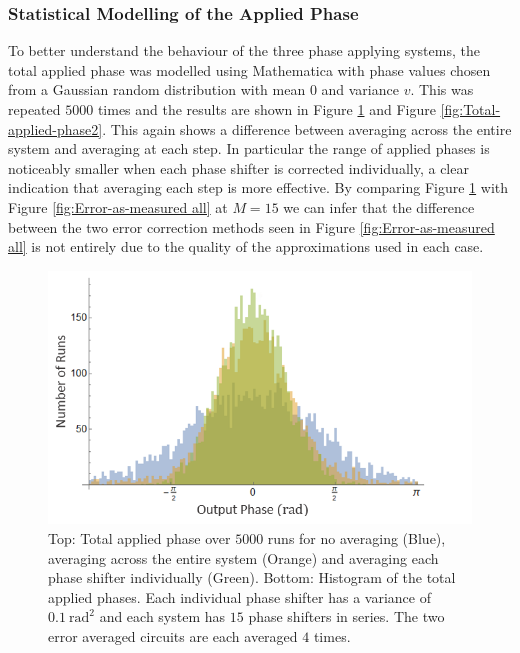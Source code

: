 \documentclass[aps,pra,twocolumn,superscriptaddress,numerical]{revtex4-1}
\begin{document}
		
		\subsubsection{Statistical Modelling of the Applied Phase\label{Statistical Modelling of the Applied Phase}}
		
		To better understand the behaviour of the three phase applying systems, the total applied phase was modelled using Mathematica with phase values chosen from a Gaussian random distribution with mean $0$ and variance $v$. This was repeated $5000$ times and the results are shown in Figure \ref{fig:Total-applied-phase1} and Figure \ref{fig:Total-applied-phase2}. This again shows a difference between averaging across the entire system and averaging at each step. In particular the range of applied phases is noticeably smaller when each phase shifter is corrected individually, a clear indication that averaging each step is more effective. By comparing Figure \ref{fig:Total-applied-phase1} with Figure \ref{fig:Error-as-measured all} at $M=15$ we can infer that the difference between the two error correction methods seen in Figure \ref{fig:Error-as-measured all} is not entirely due to the quality of the approximations used in each case.
		
		\begin{figure}
			\begin{centering}
				\includegraphics[width=\columnwidth]{totPhase1.png}
				\par\end{centering}
			
			\caption[Statistical simulation of total applied phase for no correction, correcting across the system and correcting each element individually for a larger system. ]{Top: Total applied phase over $5000$ runs for no averaging (Blue), averaging across the entire system (Orange) and averaging each phase shifter individually (Green). Bottom: Histogram of the total applied phases. Each individual phase shifter has a variance of $0.1\ \textrm{rad}^{2}$ and each system has $15$ phase shifters in series. The two error averaged circuits are each averaged $4$ times. \label{fig:Total-applied-phase1}}
		\end{figure}
		
\end{document}
